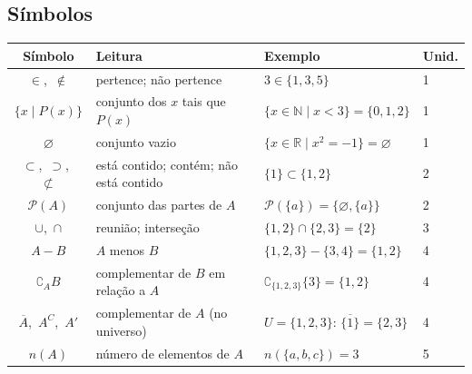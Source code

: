 \subsection*{Símbolos}
\begin{center}\small
\begin{tabular}{clll}\toprule
\sffamily\bfseries Símbolo & \sffamily\bfseries Leitura & \sffamily\bfseries Exemplo & \sffamily\bfseries Unid.\\\midrule
$\in$,\ $\notin$ & pertence; não pertence & $3\in\{1,3,5\}$ & 1\\
$\{x\mid P(x)\}$ & conjunto dos $x$ tais que $P(x)$ & $\{x\in\mathbb{N}\mid x<3\}=\{0,1,2\}$ & 1\\
$\varnothing$ & conjunto vazio & $\{x\in\mathbb{R}\mid x^2=-1\}=\varnothing$ & 1\\
$\subset$,\ $\supset$,\ $\not\subset$ & está contido; contém; não está contido & $\{1\}\subset\{1,2\}$ & 2\\
$\mathcal{P}(A)$ & conjunto das partes de $A$ & $\mathcal{P}(\{a\})=\{\varnothing,\{a\}\}$ & 2\\
$\cup$,\ $\cap$ & reunião; interseção & $\{1,2\}\cap\{2,3\}=\{2\}$ & 3\\
$A-B$ & $A$ menos $B$ & $\{1,2,3\}-\{3,4\}=\{1,2\}$ & 4\\
$\complement_A B$ & complementar de $B$ em relação a $A$ & $\complement_{\{1,2,3\}}\{3\}=\{1,2\}$ & 4\\
$\overline{A}$,\ $A^{C}$,\ $A'$ & complementar de $A$ (no universo) & $U=\{1,2,3\}$: $\overline{\{1\}}=\{2,3\}$ & 4\\
$n(A)$ & número de elementos de $A$ & $n(\{a,b,c\})=3$ & 5\\\bottomrule
\end{tabular}
\end{center}
